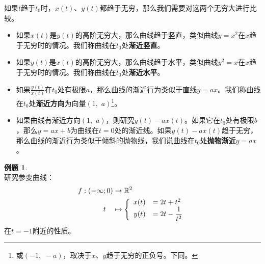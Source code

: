 \documentclass[12pt,UTF8]{ctexbook}
\theoremstyle{definition}
\newtheorem{et}{例题}[section]
\theoremstyle{plain}
\begin{document}
如果$t$趋于$t_0$时，$x(t)$、$y(t)$都趋于无穷，那么我们需要对这两个无穷大进行比较。
\begin{itemize}
    \item 如果$x(t)$是$y(t)$的高阶无穷大，那么曲线趋于竖直，类似曲线$y = x^2$在$x$趋于无穷时的情况。我们称曲线在$t_0$处\textbf{渐近竖直}。
    \item 如果$y(t)$是$x(t)$的高阶无穷大，那么曲线趋于水平，类似曲线$y^2 = x$在$x$趋于无穷时的情况。我们称曲线在$t_0$处\textbf{渐近水平}。
    \item 如果$\frac{y(t)}{x(t)}$在$t_0$处有极限$a$，那么曲线的渐近行为类似于直线$y = ax$。我们称曲线在$t_0$处\textbf{渐近方向}为向量$(1,\,\,a)$\footnote{或$(-1,\,\,-a)$，取决于$x$、$y$趋于无穷的正负号。下同。}。
    \item 如果曲线有渐近方向$(1, \,\,a)$，则研究$y(t) - ax(t)$。如果它在$t_0$处有极限$b$，那么$y = ax + b$为曲线在$t=0$处的渐近线。如果$y(t) - ax(t)$趋于无穷，那么曲线的渐近行为类似于倾斜的抛物线，我们说曲线在$t_0$处\textbf{抛物渐近}$y = ax$。
\end{itemize}

\begin{et}
    \mbox{} \\
    研究参变曲线：%
    \begin{align*}
        f: (-\infty;0) &\rightarrow \mathbb{R}^2 \\
        t\quad &\mapsto\left\{
            \begin{array}[]{rl}
                x(t) &=2t + t^2 \\
                y(t) &\displaystyle = 2t - \frac{1}{t^2}\\
            \end{array}
        \right.
    \end{align*}
    在$t=-1$附近的性质。
\end{et}
\end{document}
